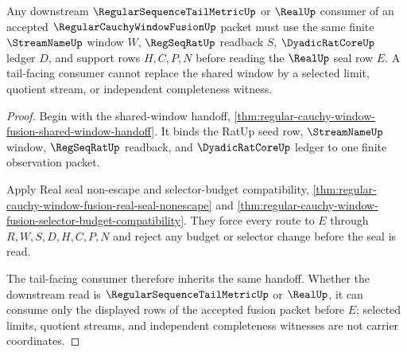 \begin{theorem}
\label{thm:regular-cauchy-window-fusion-tail-handoff}
Any downstream $\RegularSequenceTailMetricUp$ or $\RealUp$ consumer of an accepted $\RegularCauchyWindowFusionUp$ packet must use the same finite $\StreamNameUp$ window $W$, $\RegSeqRatUp$ readback $S$, $\DyadicRatCoreUp$ ledger $D$, and support rows $H,C,P,N$ before reading the $\RealUp$ seal row $E$. A tail-facing consumer cannot replace the shared window by a selected limit, quotient stream, or independent completeness witness.
\end{theorem}
\begin{proof}
Begin with the shared-window handoff, \autoref{thm:regular-cauchy-window-fusion-shared-window-handoff}. It binds the RatUp seed row, $\StreamNameUp$ window, $\RegSeqRatUp$ readback, and $\DyadicRatCoreUp$ ledger to one finite observation packet.

Apply Real seal non-escape and selector-budget compatibility, \autoref{thm:regular-cauchy-window-fusion-real-seal-nonescape} and \autoref{thm:regular-cauchy-window-fusion-selector-budget-compatibility}. They force every route to $E$ through $R,W,S,D,H,C,P,N$ and reject any budget or selector change before the seal is read.

The tail-facing consumer therefore inherits the same handoff. Whether the downstream read is $\RegularSequenceTailMetricUp$ or $\RealUp$, it can consume only the displayed rows of the accepted fusion packet before $E$; selected limits, quotient streams, and independent completeness witnesses are not carrier coordinates.
\end{proof}

